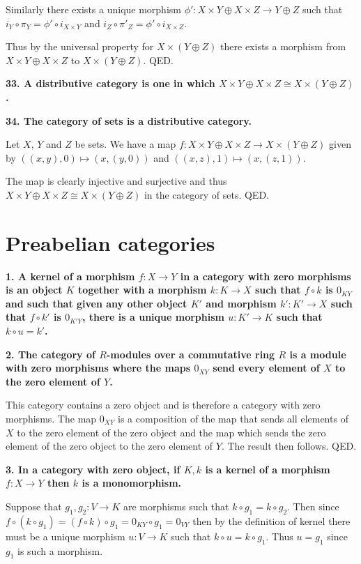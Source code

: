 \documentclass[12pt]{article}
\begin{document}
Similarly there exists a unique morphism $\phi' : X\times Y\oplus X\times Z \to Y\oplus Z$ such that $i_Y\circ \pi_Y = \phi'\circ i_{X\times Y}$ and $i_Z\circ \pi'_Z = \phi'\circ i_{X\times Z}$.

Thus by the universal property for $X\times(Y\oplus Z)$ there exists a morphism from $X\times Y\oplus X\times Z$ to $X\times(Y\oplus Z)$. QED.

\textbf{33. A distributive category is one in which $X\times Y\oplus X\times Z \cong X\times(Y\oplus Z)$.}

\textbf{34. The category of sets is a distributive category.}

Let $X$, $Y$ and $Z$ be sets. We have a map $f : X\times Y\oplus X\times Z \to X\times(Y\oplus Z)$ given by $((x, y), 0) \mapsto (x, (y, 0))$ and $((x, z), 1) \mapsto (x, (z, 1))$.

The map is clearly injective and surjective and thus $X\times Y\oplus X\times Z \cong X\times(Y\oplus Z)$ in the category of sets. QED.

\section{Preabelian categories}

\textbf{1. A kernel of a morphism $f : X \to Y$ in a category with zero morphisms is an object $K$ together with a morphism $k : K \to X$ such that $f\circ k$ is $0_{KY}$ and such that given any other object $K'$ and morphism $k' : K' \to X$ such that $f\circ k'$ is $0_{K'Y}$, there is a unique morphism $u : K' \to K$ such that $k\circ u = k'$.}

\textbf{2. The category of $R$-modules over a commutative ring $R$ is a module with zero morphisms where the maps $0_{XY}$ send every element of $X$ to the zero element of $Y$.}

This category contains a zero object and is therefore a category with zero morphisms. The map $0_{XY}$ is a composition of the map that sends all elements of $X$ to the zero element of the zero object and the map which sends the zero element of the zero object to the zero element of $Y$. The result then follows. QED.

\textbf{3. In a category with zero object, if $K, k$ is a kernel of a morphism $f : X \to Y$ then $k$ is a monomorphism.}

Suppose that $g_1, g_2 : V \to K$ are morphisms such that $k\circ g_1 = k\circ g_2$. Then since $f\circ (k\circ g_1) = (f\circ k)\circ g_1 = 0_{KY}\circ g_1 = 0_{VY}$ then by the definition of kernel there must be a unique morphism $u : V \to K$ such that $k\circ u = k\circ g_1$. Thus $u = g_1$ since $g_1$ is such a morphism.
\end{document}
